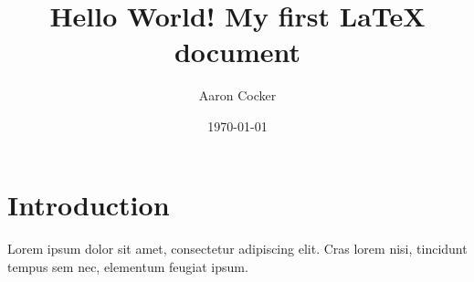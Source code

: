 \documentclass[a4paper,12pt]{article}
\begin{document}
\title{Hello World! My first LaTeX document}
\author{Aaron Cocker}
\date{\today}
\maketitle

\section{Introduction}

\paragraph{}
Lorem ipsum dolor sit amet, consectetur adipiscing elit. Cras lorem nisi, tincidunt tempus sem nec, elementum feugiat ipsum. 
\end{document}
